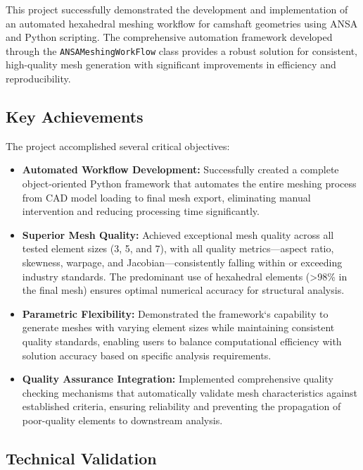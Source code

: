 \documentclass{book}
\begin{document}
\begin{itemize}[leftmargin=*,label=\textbullet]
\begin{itemize}
This project successfully demonstrated the development and implementation of an automated hexahedral meshing workflow for camshaft geometries using ANSA and Python scripting. The comprehensive automation framework developed through the \texttt{ANSAMeshingWorkFlow} class provides a robust solution for consistent, high-quality mesh generation with significant improvements in efficiency and reproducibility.

\subsection{Key Achievements}

The project accomplished several critical objectives:

\begin{itemize}
    \item \textbf{Automated Workflow Development:} Successfully created a complete object-oriented Python framework that automates the entire meshing process from CAD model loading to final mesh export, eliminating manual intervention and reducing processing time significantly.
    
    \item \textbf{Superior Mesh Quality:} Achieved exceptional mesh quality across all tested element sizes (3, 5, and 7), with all quality metrics—aspect ratio, skewness, warpage, and Jacobian—consistently falling within or exceeding industry standards. The predominant use of hexahedral elements (>98\% in the final mesh) ensures optimal numerical accuracy for structural analysis.
    
    \item \textbf{Parametric Flexibility:} Demonstrated the framework`s capability to generate meshes with varying element sizes while maintaining consistent quality standards, enabling users to balance computational efficiency with solution accuracy based on specific analysis requirements.
    
    \item \textbf{Quality Assurance Integration:} Implemented comprehensive quality checking mechanisms that automatically validate mesh characteristics against established criteria, ensuring reliability and preventing the propagation of poor-quality elements to downstream analysis.
\end{itemize}

\subsection{Technical Validation}


\end{itemize}
\end{itemize}
\end{document}
